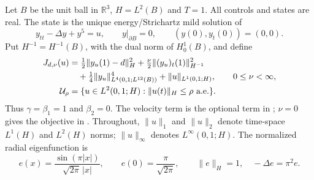 \documentclass[11pt]{article}
\newcommand{\R}{\mathbb R}
\newcommand{\U}{\mathcal U_\rho}
\newcommand{\norm}[1]{\lVert #1\rVert}
\begin{document}
Let $B$ be the unit ball in $\R^3$, $H=L^2(B)$ and $T=1$. All controls and
states are real. The state is the unique energy/Strichartz mild solution of
\begin{equation}\label{pde}
 y_{tt}-\Delta y+y^5=u,\qquad y|_{\partial B}=0,\qquad
 (y(0),y_t(0))=(0,0).
\end{equation}
Put $H^{-1}=H^{-1}(B)$, with the dual norm of $H_0^1(B)$, and define
\begin{align}\label{objective}
 J_{d,\nu}(u)&=\tfrac12\norm{y_u(1)-d}_H^2
       +\tfrac\nu2\norm{(y_u)_t(1)}_{H^{-1}}^2\notag\\
   &\quad+\tfrac14\norm{y_u}_{L^4(0,1;L^{12}(B))}^4
       +\norm{u}_{L^1(0,1;H)},\qquad 0\le\nu<\infty,\\
 \U&=\{u\in L^2(0,1;H):\norm{u(t)}_H\le\rho\text{ a.e.}\}.
 \notag
\end{align}
Thus $\gamma=\beta_1=1$ and $\beta_2=0$. The velocity term is the optional
term in \cite{OWR}; $\nu=0$ gives the objective in \cite{KM}. Throughout,
$\norm{u}_1$ and $\norm{u}_2$ denote time-space $L^1(H)$ and $L^2(H)$ norms;
$\norm{u}_\infty$ denotes $L^\infty(0,1;H)$.
The normalized radial eigenfunction is
\begin{equation}\label{mode}
 e(x)=\frac{\sin(\pi|x|)}{\sqrt{2\pi}\,|x|},\qquad
 e(0)=\frac\pi{\sqrt{2\pi}},\qquad
 \norm e_H=1,\quad -\Delta e=\pi^2e.
\end{equation}
\end{document}
